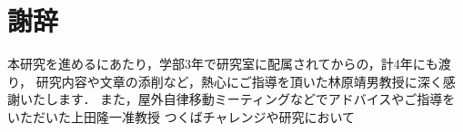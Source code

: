 \chapter*{謝辞}

本研究を進めるにあたり，学部3年で研究室に配属されてからの，計4年にも渡り，
研究内容や文章の添削など，熱心にご指導を頂いた林原靖男教授に深く感謝いたします．
また，屋外自律移動ミーティングなどでアドバイスやご指導をいただいた上田隆一准教授
つくばチャレンジや研究において
%
